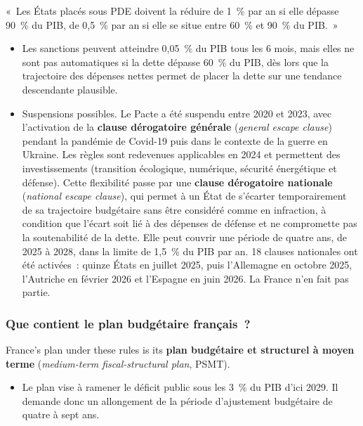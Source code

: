 \begin{remark}
  «~Les États placés sous PDE doivent la réduire de 1~\% par an si elle dépasse 90~\%
  du PIB, de 0,5~\% par an si elle se situe entre 60~\% et 90~\% du PIB.~»
\end{remark}

\begin{itemize}
  \item Les sanctions peuvent atteindre 0,05~\% du PIB tous les 6 mois, mais elles ne
    sont pas automatiques si la dette dépasse 60~\% du PIB, dès lors que la trajectoire
    des dépenses nettes permet de placer la dette sur une tendance descendante
    plausible.
  \item Suspensions possibles. Le Pacte a été suspendu entre 2020 et 2023, avec
    l'activation de la \textbf{clause dérogatoire générale} (\textit{general escape
    clause}) pendant la pandémie de Covid-19 puis dans le contexte de la guerre en
    Ukraine. Les règles sont redevenues applicables en 2024 et permettent des
    investissements (transition écologique, numérique, sécurité énergétique et
    défense). Cette flexibilité passe par une \textbf{clause dérogatoire nationale}
    (\textit{national escape clause}), qui permet à un État de s'écarter temporairement
    de sa trajectoire budgétaire sans être considéré comme en infraction, à condition
    que l'écart soit lié à des dépenses de défense et ne compromette pas la
    soutenabilité de la dette. Elle peut couvrir une période de quatre ans, de 2025 à
    2028, dans la limite de 1,5~\% du PIB par an. 18 clauses nationales ont été
    activées~: quinze États en juillet 2025, puis l'Allemagne en octobre 2025,
    l'Autriche en février 2026 et l'Espagne en juin 2026. La France n'en fait pas
    partie.
\end{itemize}

\subsubsection{Que contient le plan budgétaire français~?}

France's plan under these rules is its \textbf{plan budgétaire et structurel à moyen
terme} (\textit{medium-term fiscal-structural plan}, PSMT).
\begin{itemize}
  \item Le plan vise à ramener le déficit public sous les 3~\% du PIB d'ici 2029. Il
    demande donc un allongement de la période d'ajustement budgétaire de quatre à sept
    ans.
\end{itemize}

